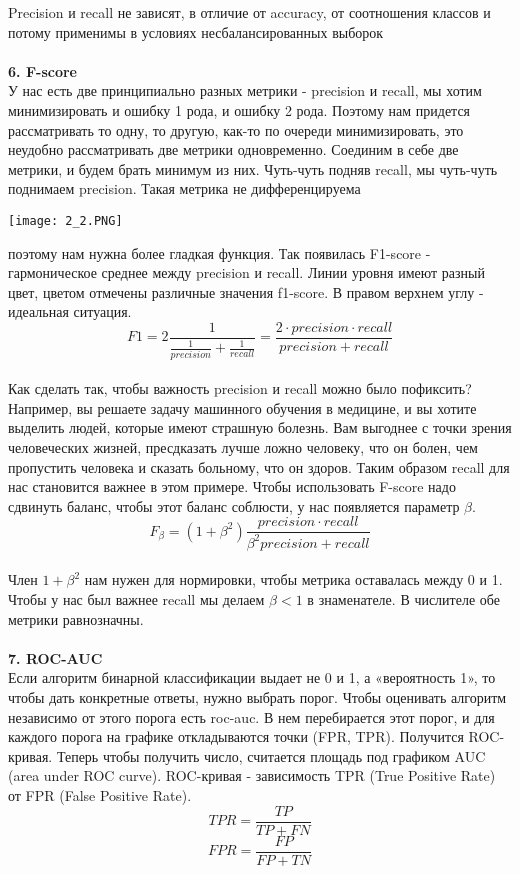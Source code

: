 Precision и recall не зависят, в отличие от accuracy, от соотношения классов и потому применимы в условиях несбалансированных выборок
\\
\\
\textbf{6. F-score}
\\
У нас есть две принципиально разных метрики - precision и recall, мы хотим минимизировать и ошибку 1 рода,
и ошибку 2 рода. Поэтому нам придется рассматривать то одну, то другую, как-то по очереди минимизировать,
это неудобно рассматривать две метрики одновременно. Соединим в себе две метрики, и будем брать минимум из них. Чуть-чуть подняв recall, мы чуть-чуть поднимаем precision. Такая метрика не дифференцируема
\begin{center}
    \texttt{[image: 2\_2.PNG]}
\end{center}
поэтому нам нужна более гладкая функция. Так появилась F1-score - гармоническое среднее между precision
и recall. Линии уровня имеют разный цвет, цветом отмечены различные значения f1-score. В правом верхнем
углу - идеальная ситуация.
$$F1 = 2\frac{1}{\frac{1}{precision}  + \frac{1}{recall}} = \frac{2 \cdot precision \cdot recall}{precision + recall}$$
\\
Как сделать так, чтобы важность precision и recall можно было пофиксить?
Например, вы решаете задачу машинного обучения в медицине, и вы хотите выделить людей, которые имеют
страшную болезнь. Вам выгоднее с точки зрения человеческих жизней, пресдказать лучше ложно человеку, что
он болен, чем пропустить человека и сказать больному, что он здоров. Таким образом recall для нас становится
важнее в этом примере.
Чтобы использовать F-score надо сдвинуть баланс, чтобы этот баланс соблюсти, у нас появляется параметр $\beta$.
$$F_{\beta} = (1 + \beta^2)\frac{  precision \cdot recall}{\beta^2 precision + recall}$$
\\
Член $1 + \beta^2$ нам нужен для нормировки, чтобы метрика оставалась между 0 и 1. Чтобы у нас был важнее
recall мы делаем $\beta < 1$ в знаменателе. В числителе обе метрики равнозначны.
\\
\\
\textbf{7.  ROC-AUC}\\
Если алгоритм бинарной классификации выдает не 0 и 1, а «вероятность 1», то чтобы дать конкретные ответы,
нужно выбрать порог. Чтобы оценивать алгоритм независимо от этого порога есть roc-auc. В нем перебирается этот
порог, и для каждого порога на графике откладываются точки (FPR, TPR). Получится ROC-кривая. Теперь чтобы
получить число, считается площадь под графиком AUC (area under ROC curve).
ROC-кривая - зависимость TPR (True Positive Rate) от FPR (False Positive Rate).
$$TPR = \frac{TP}{TP + FN}$$
$$FPR = \frac{FP}{FP + TN}$$
\\

